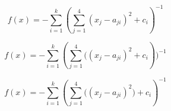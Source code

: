 \documentclass[fontsize=12, a4aper]{scrartcl}
\begin{document}
	\begin{equation} \label{subsec:Stetige_Testfunktionen:eq:Shekel}
		f(x) = -\sum_{i=1}^{k}(\sum_{j=1}^{4} (x_j - a_{ji})^2 + c_i)^{-1}
	\end{equation}
	
	\begin{equation} \label{subsec:Stetige_Testfunktionen:eq:Bachelorinterpretation}
		f(x) = -\sum_{i=1}^{k}(\sum_{j=1}^{4} \big( (x_j - a_{ji})^2 + c_i) \big)^{-1}
	\end{equation}
	
	\begin{equation} \label{subsec:Stetige_Testfunktionen:eq:Masterinterpretation}
		f(x) = -\sum_{i=1}^{k}(\sum_{j=1}^{4} \big( (x_j - a_{ji})^2 \big) + c_i)^{-1}
	\end{equation}
	
\end{document}
